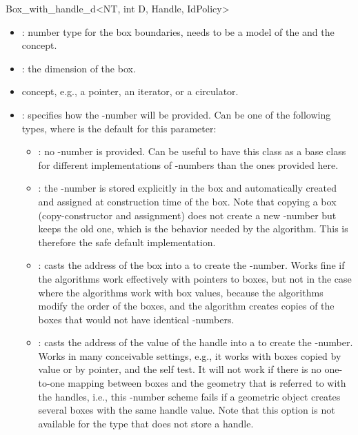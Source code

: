 \begin{ccRefClass}{Box_with_handle_d<NT, int D, Handle, IdPolicy>}
\begin{itemize}
  \item
    : number type for the box boundaries, needs to be a model
    of the  and the  concept.
  \item
    : the dimension of the box.
  \item
     concept, e.g., a pointer, an iterator, or a circulator.
  \item
    : specifies how the -number will be
    provided. Can be one of the following types, where
     is the default for this parameter:
    \begin{itemize}
      \item
        : no -number is provided. Can be useful
        to have this class as a base class for different
        implementations of -numbers than the ones provided
        here.
      \item
        : the -number is stored explicitly in
        the box and automatically created and assigned at construction
        time of the box. Note that copying a box (copy-constructor and
        assignment) does not create a new -number but keeps
        the old one, which is the behavior needed by the
         algorithm. This is therefore
        the safe default implementation. 
      \item
        : casts the address of the box into a
         to create the -number. Works fine 
        if the  algorithms work effectively with pointers
        to boxes, but not in the case where the algorithms work with
        box values, because the algorithms modify the order of the
        boxes, and the  algorithm
        creates copies of the boxes that would not have identical
        -numbers.  
      \item
        : casts the address of the value of the
        handle into a  to create the
        -number. Works in many conceivable settings, e.g.,
        it works with boxes copied by value or by pointer, and
        the self  test. It will not work if there
        is no one-to-one mapping between boxes and the geometry that
        is referred to with the handles, i.e., this -number
        scheme fails if a geometric object creates several boxes with
        the same handle value. Note that this option is not
        available for the  type
        that does not store a handle.
    \end{itemize}
\end{itemize}


\end{ccRefClass}
